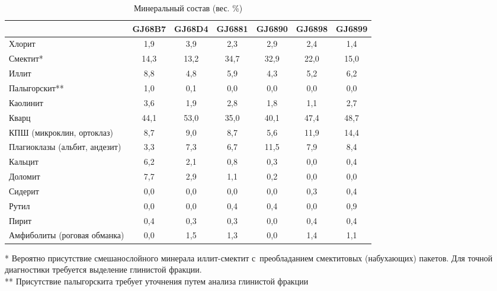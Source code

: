 \begin{table}[]
  \small
    \centering
  \begin{threeparttable}
  \caption{Минеральный состав (вес. \%)}
  \label{tab:mineral}
    \begin{tabular}{|l|c|c|c|c|c|c|}
        \hline
                                  & GJ68B7 & GJ68D4 & GJ6881 & GJ6890 & GJ6898 & GJ6899 \\ \hline
    Хлорит                        & 1,9  & 3,9  & 2,3  & 2,9  & 2,4  & 1,4  \\ \hline
    Смектит*                      & 14,3 & 13,2 & 34,7 & 32,9 & 22,0 & 15,0 \\ \hline
    Иллит                         & 8,8  & 4,8  & 5,9  & 4,3  & 5,2  & 6,2  \\ \hline
    Палыгорскит**                 & 1,0  & 0,1  & 0,0  & 0,0  & 0,0  & 0,0  \\ \hline
    Каолинит                      & 3,6  & 1,9  & 2,8  & 1,8  & 1,1  & 2,7  \\ \hline
    Кварц                         & 44,1 & 53,0 & 35,0 & 40,1 & 47,4 & 48,7 \\ \hline
    КПШ (микроклин, ортоклаз)     & 8,7  & 9,0  & 8,7  & 5,6  & 11,9 & 14,4 \\ \hline
    Плагиоклазы (альбит, андезит) & 3,3  & 7,3  & 6,7  & 11,5 & 7,9  & 8,4  \\ \hline
    Кальцит                       & 6,2  & 2,1  & 0,8  & 0,3  & 0,0  & 0,4  \\ \hline
    Доломит                       & 7,7  & 2,9  & 1,1  & 0,2  & 0,0  & 0,0  \\ \hline
    Сидерит                       & 0,0  & 0,0  & 0,0  & 0,0  & 0,3  & 0,4  \\ \hline
    Рутил                         & 0,0  & 0,0  & 0,4  & 0,4  & 0,0  & 0,9  \\ \hline
    Пирит                         & 0,4  & 0,3  & 0,3  & 0,0  & 0,4  & 0,4  \\ \hline
    Амфиболиты (роговая обманка)  & 0,0  & 1,5  & 1,3  & 0,0  & 1,4  & 1,1  \\ \hline
    \end{tabular}
    \raggedright 
    * Вероятно присутствие смешанослойного минерала иллит-смектит с~преобладанием смектитовых 
    (набухающих) пакетов. 
    Для точной диагностики требуется выделение глинистой фракции.
    \\
    ** Присутствие палыгорскита требует уточнения путем анализа глинистой фракции
    \end{threeparttable}
    \end{table}


